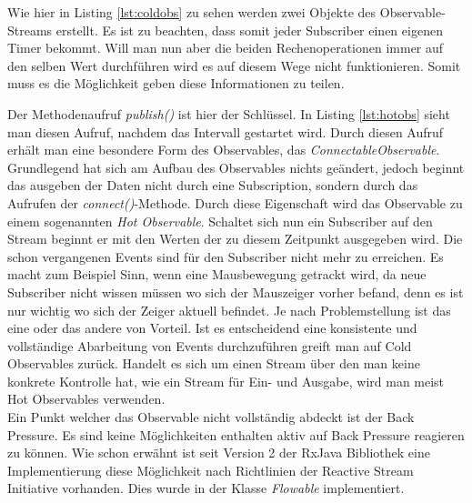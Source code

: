 Wie hier in Listing \ref{lst:coldobs} zu sehen werden zwei Objekte des Observable-Streams erstellt. Es ist zu beachten, dass somit jeder Subscriber einen eigenen Timer bekommt. Will man nun aber die beiden Rechenoperationen immer auf den selben Wert durchführen wird es auf diesem Wege nicht funktionieren. Somit muss es die Möglichkeit geben diese Informationen zu teilen.

Der Methodenaufruf \textit{publish()} ist hier der Schlüssel. In Listing \ref{lst:hotobs} sieht man diesen Aufruf, nachdem das Intervall gestartet wird. Durch diesen Aufruf erhält man eine besondere Form des Observables, das \textit{ConnectableObservable}. Grundlegend hat sich am Aufbau des Observables nichts geändert, jedoch beginnt das ausgeben der Daten nicht durch eine Subscription, sondern durch das Aufrufen der \textit{connect()}-Methode. Durch diese Eigenschaft wird das Observable zu einem sogenannten \textit{Hot Observable}. Schaltet sich nun ein Subscriber auf den Stream beginnt er mit den Werten der zu diesem Zeitpunkt ausgegeben wird. Die schon vergangenen Events sind für den Subscriber nicht mehr zu erreichen. Es macht zum Beispiel Sinn, wenn eine Mausbewegung getrackt wird, da neue Subscriber nicht wissen müssen wo sich der Mauszeiger vorher befand, denn es ist nur wichtig wo sich der Zeiger aktuell befindet. Je nach Problemstellung ist das eine oder das andere von Vorteil. Ist es entscheidend eine konsistente und vollständige Abarbeitung von Events durchzuführen greift man auf Cold Observables zurück. Handelt es sich um einen Stream über den man keine konkrete Kontrolle hat, wie ein Stream für Ein- und Ausgabe, wird man meist Hot Observables verwenden. \\ Ein Punkt welcher das Observable nicht vollständig abdeckt ist der Back Pressure. Es sind keine Möglichkeiten enthalten aktiv auf Back Pressure reagieren zu können. Wie schon erwähnt ist seit Version 2 der RxJava Bibliothek eine Implementierung diese Möglichkeit nach Richtlinien der Reactive Stream Initiative vorhanden. Dies wurde in der Klasse \textit{Flowable} implementiert.
